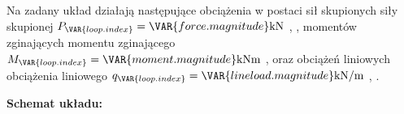 \documentclass[a4paper,10pt]{article}
\begin{document}
    Na zadany układ działają następujące obciążenia w postaci
             sił skupionych
             siły skupionej
        $P_\VAR{loop.index} = \VAR{force.magnitude} \si{\kilo\newton}$%
        , 
    ,
             momentów zginających
             momentu zginającego
        $M_\VAR{loop.index} = \VAR{moment.magnitude} \si{\kilo\newton m}$
        , 
    oraz
             obciążeń liniowych
             obciążenia liniowego
        $q_\VAR{loop.index} = \VAR{lineload.magnitude} \si{\kilo\newton/\meter}$%
        , 
    .

    \vspace{5mm}

    \noindent\textbf{Schemat układu:}
\end{document}
